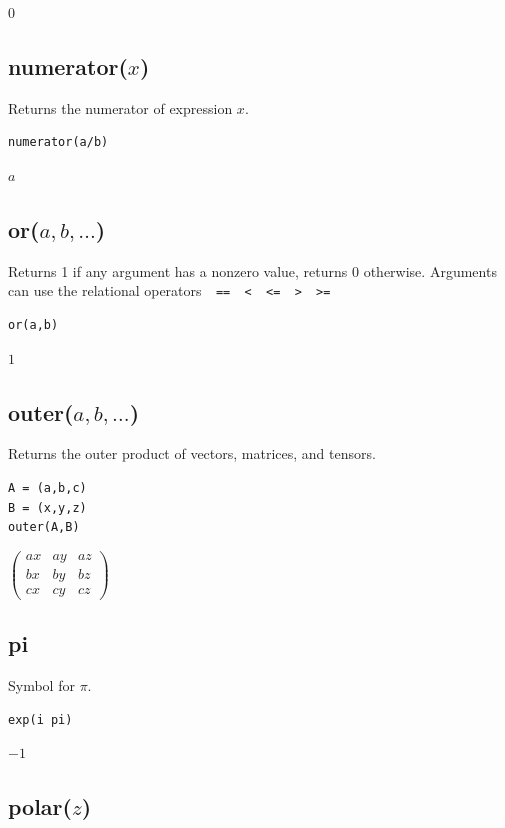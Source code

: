 \documentclass[12pt]{article}
\begin{document}
$0$

\subsection*{numerator($x$)}

Returns the numerator of expression $x$.

{\color{blue}
\begin{verbatim}
numerator(a/b)
\end{verbatim}
}

$a$

\subsection*{or($a,b,\ldots$)}

Returns 1 if any argument has a nonzero value, returns 0 otherwise.
Arguments can use the relational operators\verb$  ==  <  <=  >  >=$

{\color{blue}
\begin{verbatim}
or(a,b)
\end{verbatim}
}

$1$

\subsection*{outer($a,b,\ldots$)}

Returns the outer product of vectors, matrices, and tensors.

{\color{blue}
\begin{verbatim}
A = (a,b,c)
B = (x,y,z)
outer(A,B)
\end{verbatim}
}

$\displaystyle
\begin{pmatrix}
a x & a y & a z
\\[1ex]
b x & b y & b z
\\[1ex]
c x & c y & c z
\end{pmatrix}
$

\subsection*{pi}

Symbol for $\pi$.

{\color{blue}
\begin{verbatim}
exp(i pi)
\end{verbatim}
}

$-1$

\subsection*{polar($z$)}
\end{document}
